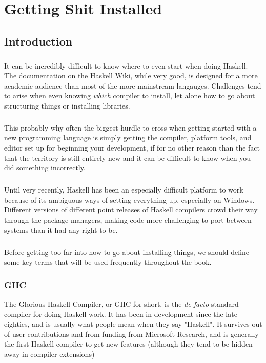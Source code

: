 \chapter{Getting Shit Installed}

\section{Introduction}

\paragraph{}
It can be incredibly difficult to know where to even start when doing Haskell.  The documentation on the Haskell Wiki, while very good, is designed for a more academic audience than most of the more mainstream langauges. Challenges tend to arise when even knowing \textit{which} compiler to install, let alone how to go about structuring things or installing libraries.  

\paragraph{}
This probably why often the biggest hurdle to cross when getting started with a new programming language is simply getting the compiler, platform tools, and editor set up for beginning your development, if for no other reason than the fact that the territory is still entirely new and it can be difficult to know when you did something incorrectly.  

\paragraph{}
Until very recently, Haskell has been an especially difficult platform to work because of its ambiguous ways of setting everything up, especially on Windows. Different versions of different point releases of Haskell compilers crowd their way through the package managers, making code more challenging to port between systems than it had any right to be. 

\paragraph{}
Before getting too far into how to go about installing things, we should define some key terms that will be used frequently throughout the book. 


\subsection{GHC}
The Glorious Haskell Compiler, or GHC for short, is the \textit{de facto} standard compiler for doing Haskell work.  It has been in development since the late eighties, and is usually what people mean when they say "Haskell".  It survives out of user contributions and from funding from Microsoft Research, and is generally the first Haskell compiler to get new features (although they tend to be hidden away in compiler extensions) 

